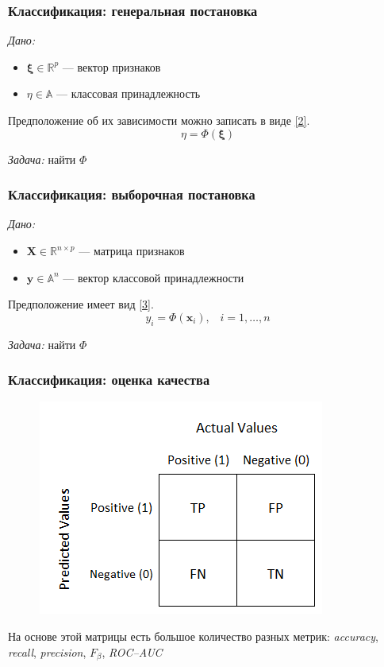 \documentclass[11pt]{beamer}
\begin{document}
	\begin{frame}
		\frametitle{Классификация: генеральная постановка}
		\textit{Дано:}
		\begin{itemize}
			\item $\bm{\xi} \in \mathbb{R}^p$ --- вектор признаков
			\item $\eta \in \mathbb{A}$ --- классовая принадлежность
		\end{itemize}
	
		Предположение об их зависимости можно записать в виде \ref{2}.
		\begin{equation}
			\eta = \Phi(\bm{\xi})
			\label{2}
		\end{equation}
		
		\textit{Задача:} найти $\Phi$
	\end{frame}

	\begin{frame}
		\frametitle{Классификация: выборочная постановка}
		\textit{Дано:}
		\begin{itemize}
			\item $\bm{X} \in \mathbb{R}^{n\times p}$ --- матрица признаков
			\item $\bm{y} \in \mathbb{A}^n$ --- вектор классовой принадлежности
		\end{itemize}
		
		Предположение имеет вид \ref{3}.
		\begin{equation}
			y_i = \Phi(\bm{x}_i),\;\;\; i = 1, \ldots, n
			\label{3}
		\end{equation}
		
		\textit{Задача:} найти $\Phi$
	\end{frame}

	\begin{frame}
		\frametitle{Классификация: оценка качества}
		\begin{figure}
			\includegraphics[width=0.3\linewidth]{imgs/conf_matrix}
		\end{figure}
	    На основе этой матрицы есть большое количество разных метрик: \textit{accuracy}, \textit{recall}, \textit{precision}, $F_\beta$, \textit{ROC--AUC}
	\end{frame}
\end{document}
